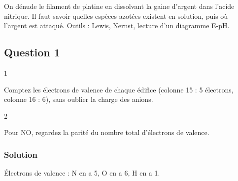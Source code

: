 \documentclass[11pt,a4paper]{article}
\begin{document}
On dénude le filament de platine en dissolvant la gaine d'argent dans l'acide nitrique. Il faut savoir quelles espèces azotées existent en solution, puis où l'argent est attaqué. Outils : Lewis, Nernst, lecture d'un diagramme E-pH.

\hypertarget{question-1}{%
\subsection{Question 1}\label{question-1}}

\begin{indication}{1}

Comptez les électrons de valence de chaque édifice (colonne 15 : 5 électrons, colonne 16 : 6), sans oublier la charge des anions.

\end{indication}

\begin{indication}{2}

Pour NO, regardez la parité du nombre total d'électrons de valence.

\end{indication}

\hypertarget{solution}{%
\subsubsection{Solution}\label{solution}}

Électrons de valence : N en a 5, O en a 6, H en a 1.
\end{document}
